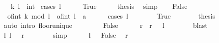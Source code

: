 \begin{isabellebody}
\ \ \ k\ l\ {\isacharcolon}{\kern0pt}{\isacharcolon}{\kern0pt}\ int\isanewline
%
\isadelimproof
%
\endisadelimproof
%
\isatagproof
{}\isamarkupfalse%
\ {\isacharparenleft}{\kern0pt}cases\ {\isachardoublequoteopen}l\ {\isacharequal}{\kern0pt}\ {}{\isachardoublequoteclose}{\isacharparenright}{\kern0pt}\isanewline
\ \ \isamarkupfalse%
\ True\isanewline
\ \ \isamarkupfalse%
\ \isamarkupfalse%
\ {\isacharquery}{\kern0pt}thesis\ \isamarkupfalse%
\ simp\isanewline
{}\isamarkupfalse%
\isanewline
\ \ \isamarkupfalse%
\ False\isanewline
\ \ \isamarkupfalse%
\ {\isacharasterisk}{\kern0pt}{\isacharcolon}{\kern0pt}\ {\isachardoublequoteopen}{\isasymlfloor}of{\isacharunderscore}{\kern0pt}int\ {\isacharparenleft}{\kern0pt}k\ mod\ l{\isacharparenright}{\kern0pt}\ {\isacharslash}{\kern0pt}\ of{\isacharunderscore}{\kern0pt}int\ l\ {\isacharcolon}{\kern0pt}{\isacharcolon}{\kern0pt}\ {\isacharprime}{\kern0pt}a{\isasymrfloor}\ {\isacharequal}{\kern0pt}\ {}{\isachardoublequoteclose}\isanewline
\ \ \isamarkupfalse%
\ {\isacharparenleft}{\kern0pt}cases\ {\isachardoublequoteopen}l\ {\isachargreater}{\kern0pt}\ {}{\isachardoublequoteclose}{\isacharparenright}{\kern0pt}\isanewline
\ \ \ \ \isamarkupfalse%
\ True\isanewline
\ \ \ \ \isamarkupfalse%
\ \isamarkupfalse%
\ {\isacharquery}{\kern0pt}thesis\isanewline
\ \ \ \ \ \ \isamarkupfalse%
\ {\isacharparenleft}{\kern0pt}auto\ intro{\isacharcolon}{\kern0pt}\ floor{\isacharunderscore}{\kern0pt}unique{\isacharparenright}{\kern0pt}\isanewline
\ \ \isamarkupfalse%
\isanewline
\ \ \ \ \isamarkupfalse%
\ False\isanewline
\ \ \ \ \isamarkupfalse%
\ r\ \ {\isachardoublequoteopen}r\ {\isacharequal}{\kern0pt}\ {\isacharminus}{\kern0pt}\ l{\isachardoublequoteclose}\isanewline
\ \ \ \ \ \ \isamarkupfalse%
\ blast\isanewline
\ \ \ \ \isamarkupfalse%
\ \isamarkupfalse%
\ l{\isacharcolon}{\kern0pt}\ {\isachardoublequoteopen}l\ {\isacharequal}{\kern0pt}\ {\isacharminus}{\kern0pt}\ r{\isachardoublequoteclose}\isanewline
\ \ \ \ \ \ \isamarkupfalse%
\ simp\isanewline
\ \ \ \ \isamarkupfalse%
\ {\isacartoucheopen}l\ {\isasymnoteq}\ {}{\isacartoucheclose}\ False\ \isamarkupfalse%
\ {\isachardoublequoteopen}r\ {\isachargreater}{\kern0pt}\ {}{\isachardoublequoteclose}\isanewline

\end{isabellebody}
